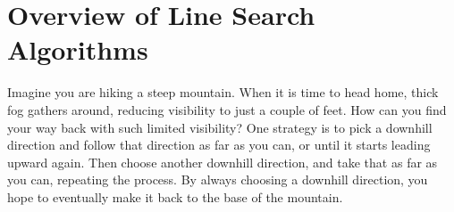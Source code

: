 \label{lab:1-dOpt}

\section*{Overview of Line Search Algorithms} %

Imagine you are hiking a steep mountain.
When it is time to head home, thick fog gathers around, reducing visibility to just a couple of feet.
How can you find your way back with such limited visibility?
One strategy is to pick a downhill direction and follow that direction as far as you can, or until it starts leading upward again.
Then choose another downhill direction, and take that as far as you can, repeating the process.
By always choosing a downhill direction, you hope to eventually make it back to the base of the mountain.

